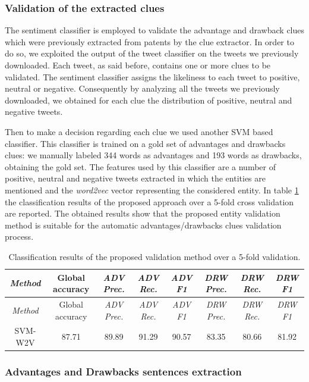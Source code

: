 \documentclass[]{book}
\begin{document}
\subsubsection*{Validation of the extracted
clues}\label{validation-of-the-extracted-clues}

The sentiment classifier is employed to validate the advantage and
drawback clues which were previously extracted from patents by the clue
extractor. In order to do so, we exploited the output of the tweet
classifier on the tweets we previously downloaded. Each tweet, as said
before, contains one or more clues to be validated. The sentiment
classifier assigns the likeliness to each tweet to positive, neutral or
negative. Consequently by analyzing all the tweets we previously
downloaded, we obtained for each clue the distribution of positive,
neutral and negative tweets.

Then to make a decision regarding each clue we used another SVM based
classifier. This classifier is trained on a gold set of advantages and
drawbacks clues: we manually labeled 344 words as advantages and 193
words as drawbacks, obtaining the gold set. The features used by this
classifier are a number of positive, neutral and negative tweets
extracted in which the entities are mentioned and the \emph{word2vec}
vector representing the considered entity. In table
\ref{tab:sentiment-validation} the classification results of the
proposed approach over a 5-fold cross validation are reported. The
obtained results show that the proposed entity validation method is
suitable for the automatic advantages/drawbacks clues validation
process.

\begin{longtable}[]{@{}cccccccc@{}}
\caption{\label{tab:sentiment-validation} Classification results of the
proposed validation method over a 5-fold validation.}\tabularnewline
\toprule
\emph{Method} & Global accuracy & \emph{ADV Prec.} & \emph{ADV Rec.} &
\emph{ADV F1} & \emph{DRW Prec.} & \emph{DRW Rec.} & \emph{DRW
F1}\tabularnewline
\midrule
\endfirsthead
\toprule
\emph{Method} & Global accuracy & \emph{ADV Prec.} & \emph{ADV Rec.} &
\emph{ADV F1} & \emph{DRW Prec.} & \emph{DRW Rec.} & \emph{DRW
F1}\tabularnewline
\midrule
\endhead
SVM-W2V & 87.71 & 89.89 & 91.29 & 90.57 & 83.35 & 80.66 &
81.92\tabularnewline
\bottomrule
\end{longtable}

\subsubsection*{Advantages and Drawbacks sentences
extraction}\label{advantages-and-drawbacks-sentences-extraction}
\end{document}
